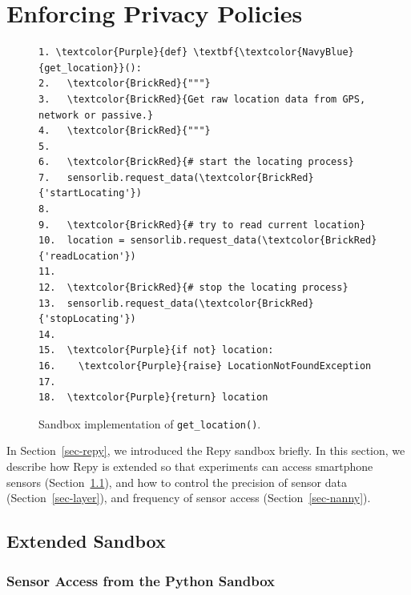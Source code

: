 \section{Enforcing Privacy Policies}\label{sec-policy}

\begin{figure}
\begin{Verbatim}
1. \textcolor{Purple}{def} \textbf{\textcolor{NavyBlue}{get_location}}():
2.   \textcolor{BrickRed}{"""}
3.   \textcolor{BrickRed}{Get raw location data from GPS, network or passive.}
4.   \textcolor{BrickRed}{"""}
5. 
6.   \textcolor{BrickRed}{# start the locating process} 
7.   sensorlib.request_data(\textcolor{BrickRed}{'startLocating'})
8.
9.   \textcolor{BrickRed}{# try to read current location}
10.  location = sensorlib.request_data(\textcolor{BrickRed}{'readLocation'})
11.
12.  \textcolor{BrickRed}{# stop the locating process} 
13.  sensorlib.request_data(\textcolor{BrickRed}{'stopLocating'})
14.
15.  \textcolor{Purple}{if not} location:
16.    \textcolor{Purple}{raise} LocationNotFoundException    
17.  
18.  \textcolor{Purple}{return} location
\end{Verbatim}
\caption{\small Sandbox implementation of \texttt{get\_location()}. 
\label{fig-getlocation}}
\end{figure}

In Section~\ref{sec-repy}, we introduced the Repy sandbox briefly. 
In this section, we describe how Repy is extended so that experiments
can access smartphone sensors (Section~\ref{sec-repy-ext}), and 
how to control the precision of sensor data (Section~\ref{sec-layer}), 
and frequency of sensor access (Section~\ref{sec-nanny}).

\subsection{Extended Sandbox}\label{sec-repy-ext}

\subsubsection{Sensor Access from the Python Sandbox}


